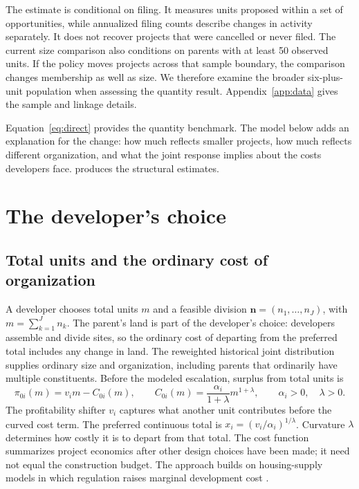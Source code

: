 \documentclass[11pt]{article}
\begin{document}
The estimate is conditional on filing. It measures units proposed within a set of opportunities, while annualized filing counts describe changes in activity separately. It does not recover projects that were cancelled or never filed. The current size comparison also conditions on parents with at least 50 observed units. If the policy moves projects across that sample boundary, the comparison changes membership as well as size. We therefore examine the broader six-plus-unit population when assessing the quantity result. Appendix~\ref{app:data} gives the sample and linkage details.

Equation~\eqref{eq:direct} provides the quantity benchmark. The model below adds an explanation for the change: how much reflects smaller projects, how much reflects different organization, and what the joint response implies about the costs developers face.  produces the structural estimates.

\section{The developer's choice}

\subsection{Total units and the ordinary cost of organization}

A developer chooses total units $m$ and a feasible division $\mathbf n=(n_1,\ldots,n_J)$, with $m=\sum_{k=1}^J n_k$. The parent's land is part of the developer's choice: developers assemble and divide sites, so the ordinary cost of departing from the preferred total includes any change in land. The reweighted historical joint distribution supplies ordinary size and organization, including parents that ordinarily have multiple constituents. Before the modeled escalation, surplus from total units is
\begin{equation}
\pi_{0i}(m)=v_i m-C_{0i}(m),
\qquad C_{0i}(m)=\frac{\alpha_i}{1+\lambda}m^{1+\lambda},
\qquad \alpha_i>0,\quad\lambda>0.
\label{eq:baseline}
\end{equation}
The profitability shifter $v_i$ captures what another unit contributes before the curved cost term. The preferred continuous total is $x_i=(v_i/\alpha_i)^{1/\lambda}$. Curvature $\lambda$ determines how costly it is to depart from that total. The cost function summarizes project economics after other design choices have been made; it need not equal the construction budget. The approach builds on housing-supply models in which regulation raises marginal development cost \citep{brueckner2024}.
\end{document}
